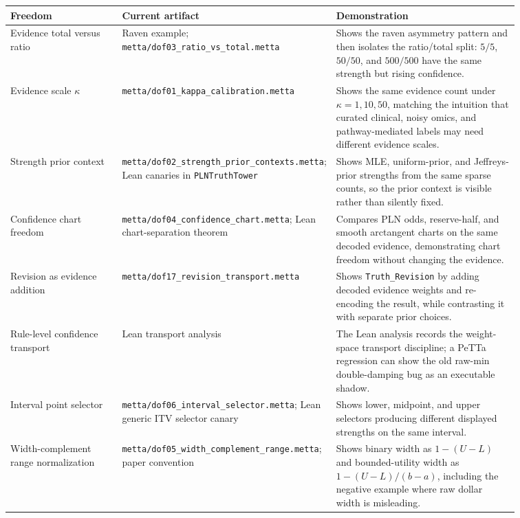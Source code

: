 \documentclass[]{article}
\newcommand{\lid}[1]{{\ttfamily\nolinkurl{#1}}}
\newcommand{\lpath}[1]{\texttt{\nolinkurl{#1}}}
\begin{document}
\begin{longtable}{p{0.22\linewidth}p{0.28\linewidth}p{0.36\linewidth}}
\toprule
Freedom & Current artifact & Demonstration \\
\midrule
\endhead
Evidence total versus ratio &
Raven example; \lpath{metta/dof03_ratio_vs_total.metta} &
Shows the raven asymmetry pattern and then isolates the ratio/total split:
$5/5$, $50/50$, and $500/500$ have the same strength but rising confidence. \\

Evidence scale $\kappa$ &
\lpath{metta/dof01_kappa_calibration.metta} &
Shows the same evidence count under $\kappa=1,10,50$, matching the intuition
that curated clinical, noisy omics, and pathway-mediated labels may need
different evidence scales. \\

Strength prior context &
\lpath{metta/dof02_strength_prior_contexts.metta};
Lean canaries in \lid{PLNTruthTower} &
Shows MLE, uniform-prior, and Jeffreys-prior strengths from the same sparse
counts, so the prior context is visible rather than silently fixed. \\

Confidence chart freedom &
\lpath{metta/dof04_confidence_chart.metta};
Lean chart-separation theorem &
Compares PLN odds, reserve-half, and smooth arctangent charts on the same
decoded evidence, demonstrating chart freedom without changing the evidence. \\

Revision as evidence addition &
\lpath{metta/dof17_revision_transport.metta} &
Shows \lid{Truth\_Revision} by adding decoded evidence weights and re-encoding
the result, while contrasting it with separate prior choices. \\

Rule-level confidence transport &
Lean transport analysis &
The Lean analysis records the weight-space transport discipline; a PeTTa
regression can show the old raw-min double-damping bug as an executable shadow. \\

Interval point selector &
\lpath{metta/dof06_interval_selector.metta};
Lean generic ITV selector canary &
Shows lower, midpoint, and upper selectors producing different displayed
strengths on the same interval. \\

Width-complement range normalization &
\lpath{metta/dof05_width_complement_range.metta};
paper convention &
Shows binary width as $1-(U-L)$ and bounded-utility width as
$1-(U-L)/(b-a)$, including the negative example where raw dollar width is
misleading. \\


\end{longtable}
\end{document}
